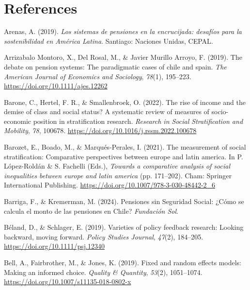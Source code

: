\documentclass[
  12pt,
]{article}
\newlength{\cslhangindent}
\newenvironment{CSLReferences}[2] %
 {\begin{list}{}{%
  \setlength{\itemindent}{0pt}
  \setlength{\leftmargin}{0pt}
  \setlength{\parsep}{0pt}
  \ifodd #1
   \setlength{\leftmargin}{\cslhangindent}
   \setlength{\itemindent}{-1\cslhangindent}
  \fi
  \setlength{\itemsep}{#2\baselineskip}}}
 {\end{list}}
\begin{document}
\section{References}\label{references}

\label{refs}
\begin{CSLReferences}{1}{0}
Arenas, A. (2019). \emph{Los sistemas de pensiones en la encrucijada:
desafíos para la sostenibilidad en América Latina}. Santiago: Naciones
Unidas, CEPAL.

Arrizabalo Montoro, X., Del Rosal, M., \& Javier Murillo Arroyo, F.
(2019). The debate on pension systems: The paradigmatic cases of chile
and spain. \emph{The American Journal of Economics and Sociology},
\emph{78}(1), 195--223. \url{https://doi.org/10.1111/ajes.12262}

Barone, C., Hertel, F. R., \& Smallenbroek, O. (2022). The rise of
income and the demise of class and social status? A systematic review of
measures of socio-economic position in stratification research.
\emph{Research in Social Stratification and Mobility}, \emph{78},
100678. \url{https://doi.org/10.1016/j.rssm.2022.100678}

Barozet, E., Boado, M., \& Marqués-Perales, I. (2021). The measurement
of social stratification: Comparative perspectives between europe and
latin america. In P. López-Roldán \& S. Fachelli (Eds.), \emph{Towards a
comparative analysis of social inequalities between europe and latin
america} (pp. 171--202). Cham: Springer International Publishing.
\url{https://doi.org/10.1007/978-3-030-48442-2_6}

Barriga, F., \& Kremerman, M. (2024). Pensiones sin Seguridad Social:
¿Cómo se calcula el monto de las pensiones en Chile? \emph{Fundación
Sol}.

Béland, D., \& Schlager, E. (2019). Varieties of policy feedback
research: Looking backward, moving forward. \emph{Policy Studies
Journal}, \emph{47}(2), 184--205.
\url{https://doi.org/10.1111/psj.12340}

Bell, A., Fairbrother, M., \& Jones, K. (2019). Fixed and random effects
models: Making an informed choice. \emph{Quality \& Quantity},
\emph{53}(2), 1051--1074.
\url{https://doi.org/10.1007/s11135-018-0802-x}


\end{CSLReferences}
\end{document}
